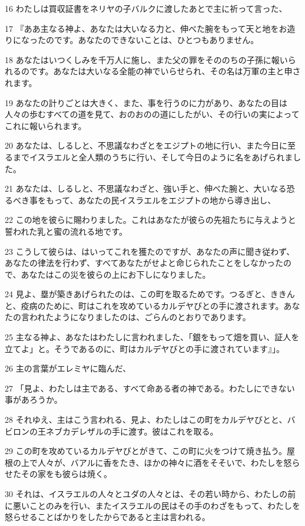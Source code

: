 \par 16 わたしは買収証書をネリヤの子バルクに渡したあとで主に祈って言った、
\par 17 『ああ主なる神よ、あなたは大いなる力と、伸べた腕をもって天と地をお造りになったのです。あなたのできないことは、ひとつもありません。
\par 18 あなたはいつくしみを千万人に施し、また父の罪をそののちの子孫に報いられるのです。あなたは大いなる全能の神でいらせられ、その名は万軍の主と申されます。
\par 19 あなたの計りごとは大きく、また、事を行うのに力があり、あなたの目は人々の歩むすべての道を見て、おのおのの道にしたがい、その行いの実によってこれに報いられます。
\par 20 あなたは、しるしと、不思議なわざとをエジプトの地に行い、また今日に至るまでイスラエルと全人類のうちに行い、そして今日のように名をあげられました。
\par 21 あなたは、しるしと、不思議なわざと、強い手と、伸べた腕と、大いなる恐るべき事をもって、あなたの民イスラエルをエジプトの地から導き出し、
\par 22 この地を彼らに賜わりました。これはあなたが彼らの先祖たちに与えようと誓われた乳と蜜の流れる地です。
\par 23 こうして彼らは、はいってこれを獲たのですが、あなたの声に聞き従わず、あなたの律法を行わず、すべてあなたがせよと命じられたことをしなかったので、あなたはこの災を彼らの上にお下しになりました。
\par 24 見よ、塁が築きあげられたのは、この町を取るためです。つるぎと、ききんと、疫病のために、町はこれを攻めているカルデヤびとの手に渡されます。あなたの言われたようになりましたのは、ごらんのとおりであります。
\par 25 主なる神よ、あなたはわたしに言われました、「銀をもって畑を買い、証人を立てよ」と。そうであるのに、町はカルデヤびとの手に渡されています』」。
\par 26 主の言葉がエレミヤに臨んだ、
\par 27 「見よ、わたしは主である、すべて命ある者の神である。わたしにできない事があろうか。
\par 28 それゆえ、主はこう言われる、見よ、わたしはこの町をカルデヤびとと、バビロンの王ネブカデレザルの手に渡す。彼はこれを取る。
\par 29 この町を攻めているカルデヤびとがきて、この町に火をつけて焼き払う。屋根の上で人々が、バアルに香をたき、ほかの神々に酒をそそいで、わたしを怒らせたその家をも彼らは焼く。
\par 30 それは、イスラエルの人々とユダの人々とは、その若い時から、わたしの前に悪いことのみを行い、またイスラエルの民はその手のわざをもって、わたしを怒らせることばかりをしたからであると主は言われる。
